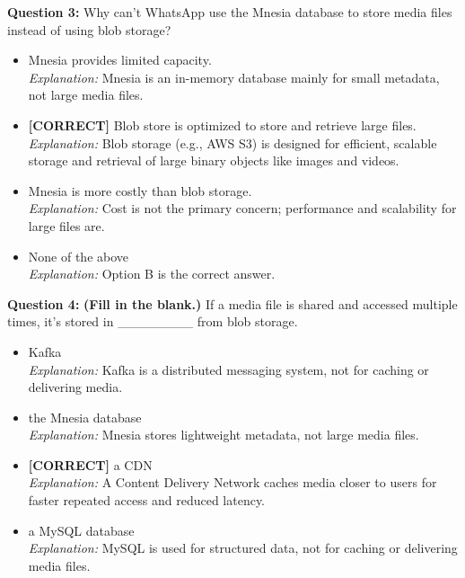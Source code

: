 \vspace{0.3cm}
\noindent
\textbf{Question 3:} Why can't WhatsApp use the Mnesia database to store media files instead of using blob storage?
\\[0.2cm]
\begin{itemize}
 \item Mnesia provides limited capacity.
\\[0.1cm]
\textit{Explanation:} 
Mnesia is an in-memory database mainly for small metadata, not large media files.
 \item \textbf{[CORRECT]} Blob store is optimized to store and retrieve large files.
\\[0.1cm]
\textit{Explanation:} 
Blob storage (e.g., AWS S3) is designed for efficient, scalable storage and retrieval of large binary objects like images and videos.
 \item Mnesia is more costly than blob storage.
\\[0.1cm]
\textit{Explanation:} 
Cost is not the primary concern; performance and scalability for large files are.
 \item None of the above
\\[0.1cm]
\textit{Explanation:} 
Option B is the correct answer.
\end{itemize}
\vspace{0.3cm}
\noindent
\textbf{Question 4:} \textbf{(Fill in the blank.)} If a media file is shared and accessed multiple times, it's stored in \_\_\_\_\_\_\_\_ from blob storage.
\\[0.2cm]
\begin{itemize}
 \item Kafka
\\[0.1cm]
\textit{Explanation:} 
Kafka is a distributed messaging system, not for caching or delivering media.
 \item the Mnesia database
\\[0.1cm]
\textit{Explanation:} 
Mnesia stores lightweight metadata, not large media files.
 \item \textbf{[CORRECT]} a CDN
\\[0.1cm]
\textit{Explanation:} 
A Content Delivery Network caches media closer to users for faster repeated access and reduced latency.
 \item a MySQL database
\\[0.1cm]
\textit{Explanation:} 
MySQL is used for structured data, not for caching or delivering media files.
\end{itemize}
\vspace{0.3cm}
